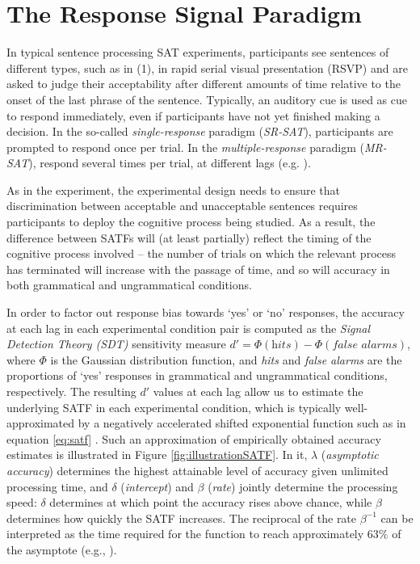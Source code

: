 \documentclass[10pt,letterpaper]{article}
\begin{document}
\section{The Response Signal Paradigm}\label{the-response-signal-paradigm}

In typical sentence processing SAT experiments, participants see sentences of different types, such as in (1), in rapid serial visual presentation (RSVP) and are asked to judge their acceptability after different amounts of time relative to the onset of the last phrase of the sentence. Typically, an auditory cue is used as cue to respond immediately, even if participants have not yet finished making a decision. In the so-called \textit{single-response} paradigm (\textit{SR-SAT}), participants are prompted to respond once per trial. In the \textit{multiple-response} paradigm (\textit{MR-SAT}), respond several times per trial, at different lags (e.g. \cite{McElree1993}).

As in the  experiment, the experimental design needs to ensure that discrimination between acceptable and unacceptable sentences requires participants to deploy the cognitive process being studied. As a result, the difference between SATFs will (at least partially) reflect the timing of the cognitive process involved -- the number of trials on which the relevant process has terminated will increase with the passage of time, and so will accuracy in both grammatical and ungrammatical conditions.

In order to factor out response bias towards `yes' or `no' responses, the accuracy at each lag in each experimental condition pair is computed as the \textit{Signal Detection Theory (SDT)} sensitivity measure $d' = \Phi(\textit{hits}) - \Phi(\textit{false alarms})$, where $\Phi$ is the Gaussian distribution function, and \textit{hits} and \textit{false alarms} are the proportions of `yes' responses in grammatical and ungrammatical conditions, respectively. The resulting $d'$ values at each lag allow us to estimate the underlying SATF in each experimental condition, which is typically well-approximated by a negatively accelerated shifted exponential function such as in equation \ref{eq:satf} \cite{Dosher1979}. Such an approximation of empirically obtained accuracy estimates is illustrated in Figure \ref{fig:illustrationSATF}. In it, $\lambda$ (\textit{asymptotic accuracy}) determines the highest attainable level of accuracy given unlimited processing time, and $\delta$ (\textit{intercept}) and $\beta$ (\textit{rate}) jointly determine the processing speed: $\delta$ determines at which point the accuracy rises above chance, while $\beta$ determines how quickly the SATF increases. The reciprocal of the rate $\beta^{-1}$ can be interpreted as the time required for the function to reach approximately $63\%$ of the asymptote  (e.g., ).
\end{document}
